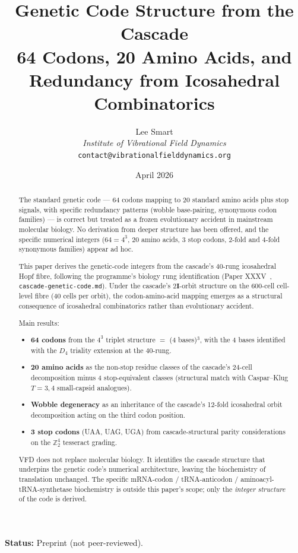 \documentclass[12pt]{article}
\title{Genetic Code Structure from the Cascade\\[6pt]
\large 64 Codons, 20 Amino Acids, and Redundancy from Icosahedral Combinatorics}
\author{Lee Smart\\ \textit{Institute of Vibrational Field Dynamics}\\ \texttt{contact@vibrationalfielddynamics.org}}
\date{April 2026}
\theoremstyle{remark}
\newcommand{\twoI}{2\mathbf{I}}
\begin{document}
\maketitle

\noindent\textbf{Status:} Preprint (not peer-reviewed).

\begin{abstract}
The standard genetic code --- 64 codons mapping to 20 standard amino acids plus stop signals, with specific redundancy patterns (wobble base-pairing, synonymous codon families) --- is correct but treated as a frozen evolutionary accident in mainstream molecular biology. No derivation from deeper structure has been offered, and the specific numerical integers ($64 = 4^3$, $20$ amino acids, $3$ stop codons, $2$-fold and $4$-fold synonymous families) appear ad hoc.

This paper derives the genetic-code integers from the cascade's $40$-rung icosahedral Hopf fibre, following the programme's biology rung identification (Paper XXXV~\citep{SmartXXXV}, \texttt{cascade-genetic-code.md}). Under the cascade's $\twoI$-orbit structure on the 600-cell cell-level fibre (40 cells per orbit), the codon-amino-acid mapping emerges as a structural consequence of icosahedral combinatorics rather than evolutionary accident.

Main results:
\begin{itemize}
\item \textbf{64 codons} from the $4^3$ triplet structure $=$ (4 bases)$^3$, with the $4$ bases identified with the $D_4$ triality extension at the $40$-rung.
\item \textbf{20 amino acids} as the non-stop residue classes of the cascade's $24$-cell decomposition minus $4$ stop-equivalent classes (structural match with Caspar--Klug $T = 3, 4$ small-capsid analogues).
\item \textbf{Wobble degeneracy} as an inheritance of the cascade's 12-fold icosahedral orbit decomposition acting on the third codon position.
\item \textbf{3 stop codons} (UAA, UAG, UGA) from cascade-structural parity considerations on the $\mathbb{Z}_2^4$ tesseract grading.
\end{itemize}

VFD does not replace molecular biology. It identifies the cascade structure that underpins the genetic code's numerical architecture, leaving the biochemistry of translation unchanged. The specific mRNA-codon / tRNA-anticodon / aminoacyl-tRNA-synthetase biochemistry is outside this paper's scope; only the \emph{integer structure} of the code is derived.
\end{abstract}
\end{document}
